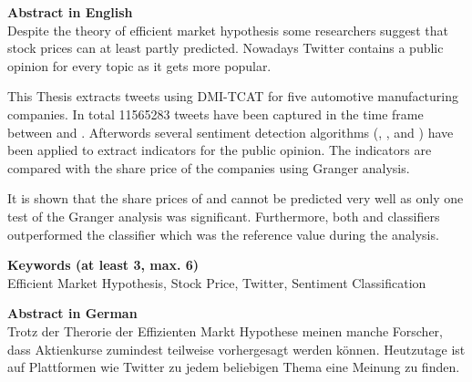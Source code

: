
\newcommand*{\AbstractHead}[1]{%
{\noindent\color{header-blue}\Large\textbf{#1}}
\vspace{10pt}\\
}%

\newcommand*{\SomeSpace}{%
\vspace{\baselineskip}
}

\AbstractHead{Abstract in English}
\noindent
\normalsize
Despite the theory of efficient market hypothesis some researchers suggest that stock prices can at least partly predicted.
Nowadays Twitter contains a public opinion for every topic as it gets more popular.

This Thesis extracts tweets using DMI-TCAT for five automotive manufacturing companies.
In total \num{11565283} tweets have been captured in the time frame between  and .
Afterwords several sentiment detection algorithms (\tb{}, \nb{}, \me{} and \svm{}) have been applied to extract indicators for the public opinion.
The indicators are compared with the share price of the companies using Granger analysis.

It is shown that the share prices of \ford{} and \hyundai{} cannot be predicted very well as only one test of the Granger analysis was significant.
Furthermore, both \svm{} and \nb{} classifiers outperformed the \tb{} classifier which was the reference value during the analysis.


\SomeSpace
\AbstractHead{Keywords (at least 3, max. 6)}
\normalsize
\noindent
Efficient Market Hypothesis, Stock Price, Twitter, Sentiment Classification

\glsresetall
\SomeSpace

\AbstractHead{Abstract in German}
\noindent
\normalsize
Trotz der Therorie der Effizienten Markt Hypothese meinen manche Forscher, dass Aktienkurse zumindest teilweise vorhergesagt werden können.
Heutzutage ist auf Plattformen wie Twitter zu jedem beliebigen Thema eine Meinung zu finden.

